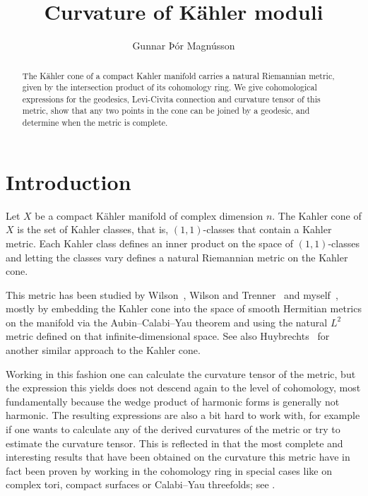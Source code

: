 \documentclass[11pt,a4paper]{amsart}
\title{Curvature of K\"{a}hler moduli}
\author{Gunnar Þór Magnússon}
\theoremstyle{definition}
\theoremstyle{remark}
\begin{document}
\begin{abstract}
The K\"{a}hler cone of a compact Kahler manifold carries a natural
Riemannian metric, given by the intersection product of its cohomology
ring. We give cohomological expressions for the geodesics, Levi-Civita
connection and curvature tensor of this metric, show that any two points
in the cone can be joined by a geodesic, and determine when the metric
is complete.
\end{abstract}

\maketitle



\section*{Introduction}

Let $X$ be a compact K\"{a}hler manifold of complex dimension $n$. The
Kahler cone of $X$ is the set of Kahler classes, that is,
$(1,1)$-classes that contain a Kahler metric. Each Kahler class defines
an inner product on the space of $(1,1)$-classes and letting the classes
vary defines a natural Riemannian metric on the Kahler cone. 

This metric has been studied by Wilson~\cite{Wilson}, Wilson and
Trenner~\cite{WilsonTrenner} and myself~\cite{Magnusson}, mostly by
embedding the Kahler cone into the space of smooth Hermitian metrics on
the manifold via the Aubin--Calabi--Yau theorem and using the natural
$L^2$ metric defined on that infinite-dimensional space. See also
Huybrechts~\cite{Huybrechts} for another similar approach to the Kahler
cone. 

Working in this fashion one can calculate the curvature tensor of
the metric, but the expression this yields does not descend again to the
level of cohomology, most fundamentally because the wedge product of
harmonic forms is generally not harmonic.  The resulting expressions are
also a bit hard to work with, for example if one wants to calculate any
of the derived curvatures of the metric or try to estimate the curvature
tensor. This is reflected in that the most complete and interesting
results that have been obtained on the curvature this metric have in
fact been proven by working in the cohomology ring in special cases like
on complex tori, compact surfaces or Calabi--Yau threefolds; see
\cite{Wilson,WilsonTrenner}.
\end{document}
